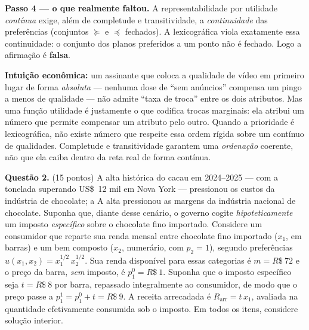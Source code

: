 \begin{solucao}
\textbf{Passo 4 --- o que realmente faltou.} A representabilidade por utilidade \emph{contínua} exige, além de completude e transitividade, a \emph{continuidade} das preferências (conjuntos $\succeq$ e $\preceq$ fechados). A lexicográfica viola exatamente essa continuidade: o conjunto dos planos preferidos a um ponto não é fechado. Logo a afirmação é \textbf{falsa}.

\textbf{Intuição econômica:} um assinante que coloca a qualidade de vídeo em primeiro lugar de forma \emph{absoluta} --- nenhuma dose de ``sem anúncios'' compensa um pingo a menos de qualidade --- não admite ``taxa de troca'' entre os dois atributos. Mas uma função utilidade é justamente o que codifica trocas marginais: ela atribui um número que permite compensar um atributo pelo outro. Quando a prioridade é lexicográfica, não existe número que respeite essa ordem rígida sobre um contínuo de qualidades. Completude e transitividade garantem uma \emph{ordenação} coerente, não que ela caiba dentro da reta real de forma contínua.
\end{solucao}


\textbf{Questão 2.} (15 pontos) A alta histórica do cacau em 2024--2025 --- com a tonelada superando US\$~12 mil em Nova York --- pressionou os custos da indústria de chocolate; a A alta pressionou as margens da indústria nacional de chocolate. Suponha que, diante desse cenário, o governo cogite \emph{hipoteticamente} um imposto \emph{específico} sobre o chocolate fino importado. Considere um consumidor que reparte sua renda mensal entre chocolate fino importado ($x_1$, em barras) e um bem composto ($x_2$, numerário, com $p_2=1$), segundo preferências $u(x_1,x_2)=x_1^{1/2}\,x_2^{1/2}$. Sua renda disponível para essas categorias é $m=R\$~72$ e o preço da barra, \emph{sem} imposto, é $p_1^{0}=R\$~1$. Suponha que o imposto específico seja $t=R\$~8$ por barra, repassado integralmente ao consumidor, de modo que o preço passe a $p_1^{1}=p_1^{0}+t=R\$~9$. A receita arrecadada é $R_{\text{arr}}=t\,x_1$, avaliada na quantidade efetivamente consumida sob o imposto. Em todos os itens, considere solução interior.

